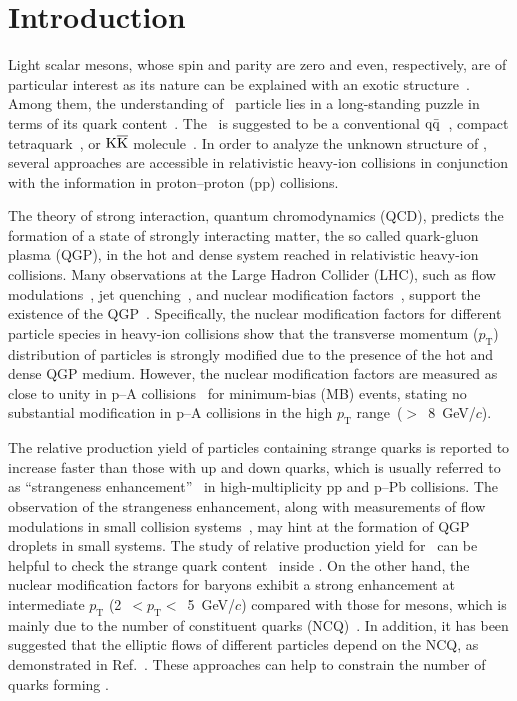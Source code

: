 
\section{Introduction}

Light scalar mesons, whose spin and parity are zero and even, respectively, are of particular interest as its nature can be explained with an exotic structure~\cite{ParticleDataGroup:2022pth}. Among them, the understanding of \fzero\ particle lies in a long-standing puzzle in terms of its quark content~\cite{ExHIC:2010gcb, Jaffe:1976ig, Maiani:2004uc}. The \fzero\ is suggested to be a conventional $\rm{}q\bar{q}$~\cite{Chen:2003za}, compact tetraquark~\cite{Achasov:2020aun}, or $\rm{}K\overline{K}$ molecule~\cite{Ahmed:2020kmp}. In order to analyze the unknown structure of \fzero, several approaches are accessible in relativistic heavy-ion collisions in conjunction with the information in proton--proton (pp) collisions. 

The theory of strong interaction, quantum chromodynamics (QCD), predicts the formation of a state of strongly interacting matter, the so called quark-gluon plasma (QGP), in the hot and dense system reached in relativistic heavy-ion collisions. Many observations at the Large Hadron Collider (LHC), such as flow modulations~\cite{Bhalerao:2020ulk, ALICE:2019zfl}, jet quenching~\cite{ALICE:2019qyj}, and nuclear modification factors~\cite{ALICE:2019hno}, support the existence of the QGP~\cite{Adams:2005dq}. Specifically, the nuclear modification factors for different particle species in heavy-ion collisions show that the transverse momentum ($p_{\mathrm{T}}$) distribution of particles is strongly modified due to the presence of the hot and dense QGP medium. However, the nuclear modification factors are measured as close to unity in p--A collisions~\cite{ALICE:2016dei} for minimum-bias (MB) events, stating no substantial modification in p--A collisions in the high $p_{\mathrm{T}}$ range~($>$~8~GeV/$c$). 

The relative production yield of particles containing strange quarks is reported to increase faster than those with up and down quarks, which is usually referred to as ``strangeness enhancement''~\cite{ALICE:2016fzo} in high-multiplicity pp and p--Pb collisions. The observation of the strangeness enhancement, along with measurements of flow modulations in small collision systems~\cite{PHENIX:2018lia, ALICE:2021nir}, may hint at the formation of QGP droplets in small systems. The study of relative production yield for \fzero\ can be helpful to check the strange quark content~\cite{LHCb:2014ooi, LHCb:2014vbo} inside \fzero. On the other hand, the nuclear modification factors for baryons exhibit a strong enhancement at intermediate $p_{\mathrm{T}}$ (2~$<p_{\mathrm{T}}<$~5~GeV/$c$) compared with those for mesons, which is mainly due to the number of constituent quarks (NCQ)~\cite{Cronin:1974zm, Fries:2003vb}. In addition, it has been suggested that the elliptic flows of different particles depend on the NCQ, as demonstrated in Ref.~\cite{Wang:2022det}. These approaches can help to constrain the number of quarks forming \fzero.

